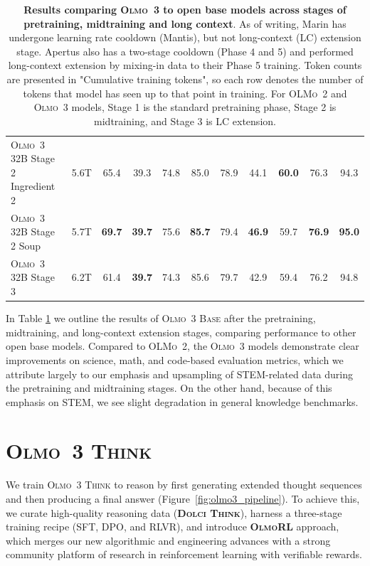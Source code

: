 \documentclass[table]{ai2style/ai2}
\newcommand{\oldOlmo}{OLMo\xspace}
\newcommand{\newOlmo}{Olmo\xspace}
\newcommand{\olmotoo}{\textsc{\oldOlmo~2}\xspace}
\newcommand{\olmothree}{\textsc{\newOlmo~3}\xspace}
\newcommand{\olmothreebase}{\textsc{\newOlmo~3 Base}\xspace}
\newcommand{\olmothreerl}{\textsc{\newOlmo{}RL}\xspace}
\newcommand{\olmothreethinking}{\textsc{Olmo~3 Think}\xspace}
\newcommand{\dolcithink}{\textsc{Dolci Think}\xspace}
\begin{document}
\begin{table}[ht!]
{\begin{center}
\begin{footnotesize}
\begin{tabular}{lc|ccccc|cccc}
\rowcolor{ai2lightpink} \olmothree 32B Stage 2 Ingredient 2 & 5.6T & 65.4 & 39.3 & 74.8 & 85.0 & 78.9 & 44.1 & {\bf{60.0}} & 76.3 & 94.3 \\
\rowcolor{ai2lightpink} \olmothree 32B Stage 2 Soup         & 5.7T & {\bf{69.7}} & {\bf{39.7}} & 75.6 & {\bf{85.7}} & 79.4 & {\bf{46.9}} & 59.7 & {\bf{76.9}} & {\bf{95.0}} \\
\rowcolor{ai2lightpink} \olmothree 32B Stage 3              & 6.2T & 61.4 & {\bf{39.7}} & 74.3 & 85.6 & 79.7 & 42.9 & 59.4 & 76.2 & 94.8 \\

\bottomrule
\end{tabular}
\end{footnotesize}
\vspace{2mm}
\caption{
\textbf{Results comparing \olmothree to open base models across stages of pretraining, midtraining and long context}.
As of writing, Marin has undergone learning rate cooldown (Mantis), but not long-context (LC) extension stage.
Apertus also has a two-stage cooldown (Phase 4 and 5) and performed long-context extension by mixing-in data to their Phase 5 training. Token counts are presented in "Cumulative training tokens", so each row denotes the number of tokens that model has seen up to that point in training. For \olmotoo and \olmothree models, Stage 1 is the standard pretraining phase, Stage 2 is midtraining, and Stage 3 is LC extension. 
}
\label{tab:base_evals_overview}
\end{center}
}
\end{table}

In Table \ref{tab:base_evals_overview} we outline the results of \olmothreebase after the pretraining, midtraining, and long-context extension stages, comparing performance to other open base models. Compared to \olmotoo, the \olmothree models demonstrate clear improvements on science, math, and code-based evaluation metrics, which we attribute largely to our emphasis and upsampling of STEM-related data during the pretraining and midtraining stages. On the other hand, because of this emphasis on STEM, we see slight degradation in general knowledge benchmarks.

\newpage
\section{\olmothreethinking}
\label{sec:posttrain-thinking}
We train \olmothreethinking{} to reason by first generating extended thought sequences and then producing a final answer (Figure~\ref{fig:olmo3_pipeline}).
To achieve this, we curate high-quality reasoning data ({\bf \dolcithink}), harness a three-stage training recipe (SFT, DPO, and RLVR), and introduce {\bf \olmothreerl} approach, which merges our new algorithmic and engineering advances with a strong community platform of research in reinforcement learning with verifiable rewards.
\end{document}
